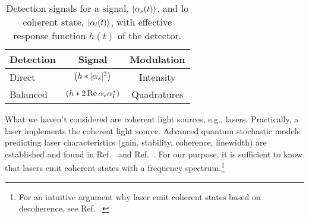 \begin{table}[htb]
	\centering	
	\begin{tabular}{lcc}
		\toprule
			Detection & Signal & Modulation \\
		\midrule
			Direct & $\left(h\ast\lvert\alpha_s\rvert^2\right)$ & Intensity \\
			Balanced & $\left(h\ast2\operatorname{Re}{\alpha_s\alpha_l^*}\right)$ & Quadratures \\
		\bottomrule
	\end{tabular}
	\caption{Detection signals for a signal, $\lvert\alpha_s(t)\rangle$, and \gls{lo} coherent state, $\lvert\alpha_l(t)\rangle$, with effective response function $h(t)$ of the detector.}
\end{table}

What we haven't considered are coherent light sources, e.g., lasers.
Practically, a laser implements the coherent light source.
Advanced quantum stochastic models predicting laser characteristics (gain, stability, coherence, linewidth) are established and found in  Ref.~\cite[p.~900]{Mandel1995} and Ref.~\cite{Haken2012}.
For our purpose, it is sufficient to know that lasers emit coherent states with a frequency spectrum.\footnote{For an intuitive argument why laser emit coherent states based on decoherence, see Ref.~\cite{Gea1998}.}